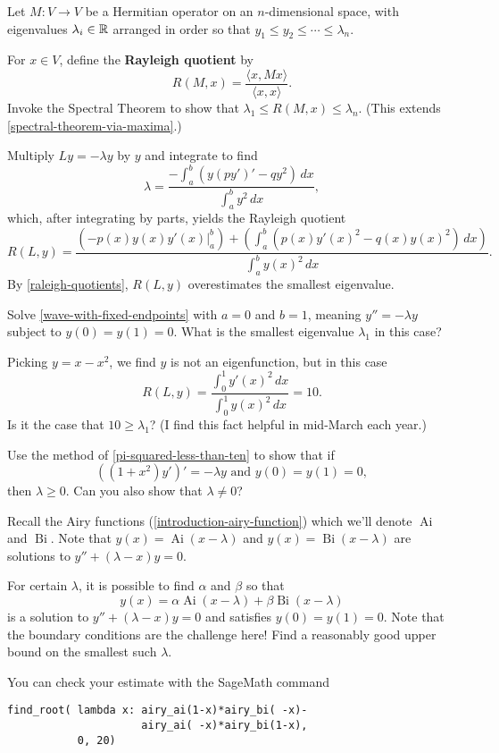 \documentclass{homework}
\DeclareMathOperator{\Ai}{Ai}
\DeclareMathOperator{\Bi}{Bi}
\begin{document}
\begin{problem}\label{raleigh-quotients}Let $M : V \to V$ be a Hermitian operator on an $n$-dimensional
  space, with eigenvalues $\lambda_i \in \mathbb{R}$ arranged in order so that
  $y_1 \leq y_2 \leq \cdots \leq \lambda _n$.

  For $x \in V$, define the \textbf{Rayleigh quotient} by
  \[R(M,x)=\frac{\langle x, Mx \rangle}{\langle x, x \rangle}.\]
  Invoke the Spectral Theorem to show that
  $\lambda_1 \leq R(M,x) \leq \lambda_n$.  (This extends
  \ref{spectral-theorem-via-maxima}.)
\end{problem}

\begin{problem}\label{pi-squared-less-than-ten}Multiply $Ly = -\lambda y$ by $y$ and integrate to find
  \[
    \lambda = \frac{ -\displaystyle\int_a^b \left( y (p y')' - q y^2  \right) \, dx }{\displaystyle\int_a^b y^2 \, dx},
  \]
  which, after integrating by parts, yields the Rayleigh quotient
  \[
    R(L,y) =  {\frac {\left(\left.-p(x)y(x)y'(x)\right|_{a}^{b}\right)+\left(\displaystyle\int _{a}^{b}\left(p(x)y'(x)^{2}-q(x)y(x)^{2}\right)\,dx\right)}{\displaystyle\int _{a}^{b}{y(x)^{2}}\,dx}}.
  \]
  By \ref{raleigh-quotients}, $R(L,y)$ overestimates the smallest eigenvalue.

  Solve \ref{wave-with-fixed-endpoints} with $a = 0$ and $b = 1$, meaning $y'' = -\lambda y$ subject to $y(0) = y(1) = 0$.  What is the smallest eigenvalue $\lambda_1$ in this case?

  Picking $y = x - x^2$, we find $y$ is not an eigenfunction, but in this case
  \[
   R(L,y) = \frac{\displaystyle\int_0^1 y'(x)^2 \, dx}{\displaystyle\int _{0}^{1}{y(x)^{2}}\,dx} = 10.
 \]
 Is it the case that $10 \geq \lambda_1$?  (I find this fact helpful in mid-March each year.)
\end{problem}

\begin{problem}
  Use the method of \ref{pi-squared-less-than-ten} to show that if
  \[
    \left( (1+x^{2}) y' \right)' =  -\lambda y \mbox{ and } y(0) = y(1) = 0,
  \]
  then $\lambda \geq 0$.  Can you also show that $\lambda \neq 0$?
\end{problem}

\begin{problem}
  Recall the Airy functions (\ref{introduction-airy-function}) which
  we'll denote $\Ai$ and $\Bi$.  Note that $y(x) = \Ai(x - \lambda)$
  and $y(x) = \Bi(x-\lambda)$ are solutions to
  $y'' + (\lambda - x) y = 0$.

  For certain $\lambda$, it is possible to find $\alpha$ and $\beta$ so that
  \[
    y(x) = \alpha \Ai(x - \lambda) + \beta \Bi(x - \lambda)
  \]
  is a solution to $y'' + (\lambda - x) y = 0$ and satisfies
  $y(0) = y(1) = 0$.  Note that the boundary conditions are the
  challenge here!  Find a reasonably good upper bound on the smallest
  such $\lambda$.

  You can check your estimate with the SageMath command
\begin{verbatim}
find_root( lambda x: airy_ai(1-x)*airy_bi( -x)-
                     airy_ai( -x)*airy_bi(1-x), 
           0, 20)
\end{verbatim}
\end{problem}
\end{document}
